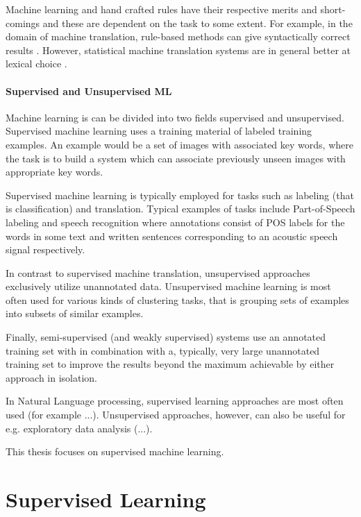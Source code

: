 Machine learning and hand crafted rules have their respective merits
and short-comings and these are dependent on the task to some
extent. For example, in the domain of machine translation, rule-based
methods can give syntactically correct results \cite{}. However,
statistical machine translation systems are in general better at
lexical choice \cite{}.

\paragraph{Supervised and Unsupervised ML}Machine learning is can be
divided into two fields supervised and unsupervised. Supervised
machine learning uses a training material of labeled training
examples. An example would be a set of images with associated key
words, where the task is to build a system which can associate
previously unseen images with appropriate key words.

Supervised machine learning is typically employed for tasks such as
labeling (that is classification) and translation. Typical examples of
tasks include Part-of-Speech labeling and speech recognition where
annotations consist of POS labels for the words in some text and
written sentences corresponding to an acoustic speech signal
respectively.

In contrast to supervised machine translation, unsupervised approaches
exclusively utilize unannotated data. Unsupervised machine learning is
most often used for various kinds of clustering tasks, that is
grouping sets of examples into subsets of similar examples. 

Finally, semi-supervised (and weakly supervised) systems use an
annotated training set with in combination with a, typically, very
large unannotated training set to improve the results beyond the
maximum achievable by either approach in isolation.

In Natural Language processing, supervised learning approaches are
most often used (for example ...). Unsupervised approaches, however,
can also be useful for e.g. exploratory data analysis (...).

This thesis focuses on supervised machine learning.

\section{Supervised Learning}


